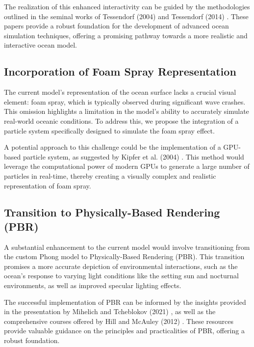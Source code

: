 The realization of this enhanced interactivity can be guided by the methodologies outlined in the seminal works of Tessendorf (2004) \cite{tessendorf2004} and Tessendorf (2014) \cite{tessendorf2014}. These papers provide a robust foundation for the development of advanced ocean simulation techniques, offering a promising pathway towards a more realistic and interactive ocean model.
\subsection{Incorporation of Foam Spray Representation} 
The current model's representation of the ocean surface lacks a crucial visual element: foam spray, which is typically observed during significant wave crashes. This omission highlights a limitation in the model's ability to accurately simulate real-world oceanic conditions. To address this, we propose the integration of a particle system specifically designed to simulate the foam spray effect.

A potential approach to this challenge could be the implementation of a GPU-based particle system, as suggested by Kipfer et al. (2004) \cite{kipfer2004}. This method would leverage the computational power of modern GPUs to generate a large number of particles in real-time, thereby creating a visually complex and realistic representation of foam spray.

\subsection{Transition to Physically-Based Rendering (PBR)} 
A substantial enhancement to the current model would involve transitioning from the custom Phong model to Physically-Based Rendering (PBR). This transition promises a more accurate depiction of environmental interactions, such as the ocean's response to varying light conditions like the setting sun and nocturnal environments, as well as improved specular lighting effects.

The successful implementation of PBR can be informed by the insights provided in the presentation by Mihelich and Tcheblokov (2021) \cite{mark2021}, as well as the comprehensive courses offered by Hill and McAuley (2012) \cite{stephan2012}. These resources provide valuable guidance on the principles and practicalities of PBR, offering a robust foundation.